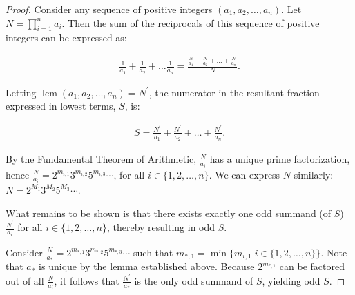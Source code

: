 \documentclass{article}
\DeclareMathOperator{\lcm}{lcm}
\begin{document}
\begin{proof}

  Consider any sequence of positive integers $(a_{1}, a_{2}, \ldots, a_{n})$.
  Let $N = \prod_{i=1}^{n} a_{i}$.
  Then the sum of the reciprocals of this sequence of positive integers can be expressed as:

  \begin{align*}
    \frac{1}{a_1} + \frac{1}{a_2} + \ldots \frac{1}{a_n} = \frac{\frac{N}{a_1} + \frac{N}{a_2} + \ldots + \frac{N}{a_n}}{N}.
  \end{align*}

  Letting $\lcm(a_{1}, a_{2}, \ldots, a_{n}) = N^{\prime}$, the numerator in the resultant fraction expressed in lowest terms, $S$, is:

  \begin{align*}
    S = \frac{N^{\prime}}{a_1} + \frac{N^{\prime}}{a_2} + \ldots + \frac{N^{\prime}}{a_n}.
  \end{align*}

  By the Fundamental Theorem of Arithmetic, $\frac{N}{a_i}$ has a unique prime factorization, hence $\frac{N}{a_i} = 2^{m_{i,1}}3^{m_{i,2}}5^{m_{i,3}}\cdots$, for all $i \in \lbrace 1, 2, \ldots, n \rbrace$.
  We can express $N$ similarly: $N = 2^{M_1}3^{M_2}5^{M_3}\cdots$.
  
  What remains to be shown is that there exists exactly one odd summand (of $S$) $\frac{N^{\prime}}{a_i}$ for all $i \in \lbrace 1, 2, \ldots, n \rbrace$, thereby resulting in odd $S$. 

  Consider $\frac{N}{a_{*}} = 2^{m_{*,1}}3^{m_{*,2}}5^{m_{*,3}}\cdots$ such that $m_{*,1} = \min \lbrace m_{i, 1} | i \in \lbrace 1, 2, \ldots, n \rbrace \rbrace$.
  Note that $a_{*}$ is unique by the lemma established above.
  Because $2^{m_{*,1}}$ can be factored out of all $\frac{N}{a_{i}}$, it follows that $\frac{N^{\prime}}{a_{*}}$ is the only odd summand of $S$, yielding odd $S$.

\end{proof}
\end{document}
